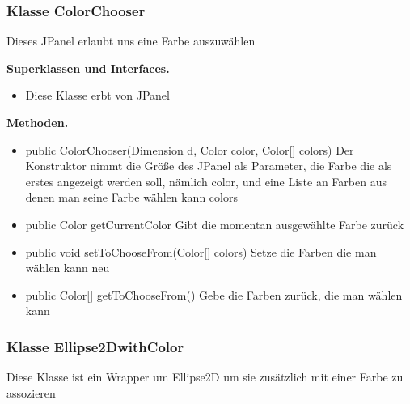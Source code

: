 \documentclass{article}
\begin{document}
	\subsubsection{Klasse ColorChooser}
    Dieses JPanel erlaubt uns eine Farbe auszuwählen\newline

	    \textbf{Superklassen und Interfaces.}\newline
	   \begin{itemize}
            \item Diese Klasse erbt von JPanel\newline
           \end{itemize}

    \textbf{Methoden.}\newline
	   \begin{itemize}
           \item public ColorChooser(Dimension d, Color color, Color[] colors) \newline
               Der Konstruktor nimmt die Größe des JPanel als Parameter,\newline
               die Farbe die als erstes angezeigt werden soll, nämlich color,\newline
               und eine Liste an Farben aus denen man seine Farbe wählen kann colors\newline
           \item public Color getCurrentColor \newline
               Gibt die momentan ausgewählte Farbe zurück\newline
           \item public void setToChooseFrom(Color[] colors) \newline
               Setze die Farben die man wählen kann neu\newline
           \item public Color[] getToChooseFrom() \newline
               Gebe die Farben zurück, die man wählen kann\newline
           \end{itemize}

	\subsubsection{Klasse Ellipse2DwithColor}
    Diese Klasse ist ein Wrapper um Ellipse2D um\newline
    sie zusätzlich mit einer Farbe zu assozieren\newline
\end{document}
